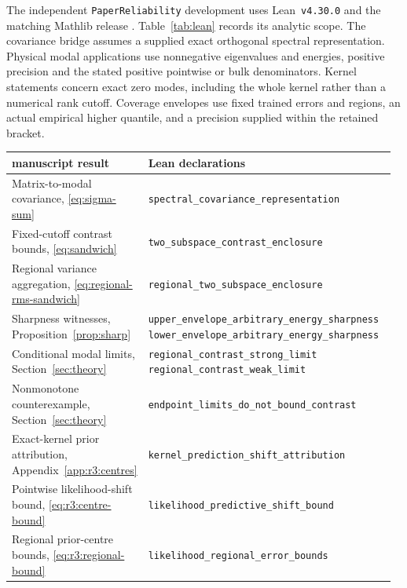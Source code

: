 The independent \texttt{PaperReliability} development uses Lean~\texttt{v4.30.0}
\citep{demoura2021lean4} and the matching Mathlib release \citep{mathlib2020}.
Table~\ref{tab:lean} records its analytic scope.
The covariance bridge assumes a supplied exact orthogonal spectral representation.
Physical modal applications use nonnegative eigenvalues and energies, positive
precision and the stated positive pointwise or bulk denominators. Kernel statements
concern exact zero modes, including the whole kernel rather than a numerical rank
cutoff. Coverage envelopes use fixed trained errors and regions, an actual empirical
higher quantile, and a precision supplied within the retained bracket.

\begin{table}[!htbp]
\centering\footnotesize\setlength{\tabcolsep}{4pt}
\begin{tabular}{@{}>{\raggedright\arraybackslash}p{0.31\linewidth}p{0.66\linewidth}@{}}
\toprule
manuscript result & Lean declarations\\
\midrule
Matrix-to-modal covariance, \eqref{eq:sigma-sum} &
  \mbox{\texttt{spectral\_covariance\_representation}}\\
Fixed-cutoff contrast bounds, \eqref{eq:sandwich} &
  \mbox{\texttt{two\_subspace\_contrast\_enclosure}}\\
Regional variance aggregation, \eqref{eq:regional-rms-sandwich} &
  \mbox{\texttt{regional\_two\_subspace\_enclosure}}\\
Sharpness witnesses, Proposition~\ref{prop:sharp} &
  \mbox{\texttt{upper\_envelope\_arbitrary\_energy\_sharpness}}\newline
  \mbox{\texttt{lower\_envelope\_arbitrary\_energy\_sharpness}}\\
Conditional modal limits, Section~\ref{sec:theory} &
  \mbox{\texttt{regional\_contrast\_strong\_limit}}\newline
  \mbox{\texttt{regional\_contrast\_weak\_limit}}\\
Nonmonotone counterexample, Section~\ref{sec:theory} &
  \mbox{\texttt{endpoint\_limits\_do\_not\_bound\_contrast}}\\
Exact-kernel prior attribution, Appendix~\ref{app:r3:centres} &
  \mbox{\texttt{kernel\_prediction\_shift\_attribution}}\\
Pointwise likelihood-shift bound, \eqref{eq:r3:centre-bound} &
  \mbox{\texttt{likelihood\_predictive\_shift\_bound}}\\
Regional prior-centre bounds, \eqref{eq:r3:regional-bound} &
  \mbox{\texttt{likelihood\_regional\_error\_bounds}}\\

\end{tabular}
\end{table}
